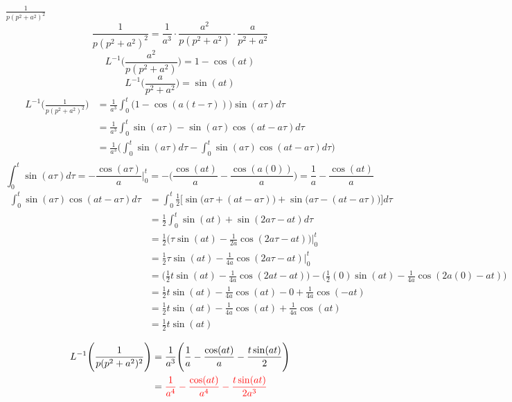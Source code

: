 \item[10.]$\frac{1}{p(p^2+a^2)^2}$
\[
    \frac{1}{p(p^2+a^2)^2} = \frac{1}{a^3} \cdot \frac{a^2}{p(p^2+a^2)} \cdot \frac{a}{p^2+a^2}
\]
\begin{equation*}
    L^{-1}\Bigg(\frac{a^2}{p(p^2+a^2)} \Bigg) 
    = 1-\cos(at)
    \tag{By \( L15 \)}
\end{equation*}
\begin{equation*}
    L^{-1}\Bigg(\frac{a}{p^2+a^2}\Bigg) 
    = \sin(at)
    \tag{By \( L3 \)}
\end{equation*}
\begin{align*}
    L^{-1}\Bigg( \frac{1}{p(p^2+a^2)^2} \Bigg)
    & = \frac{1}{a^3}\int_0^t \big(1-\cos(a(t-\tau))\big)\sin(a\tau)d\tau \\
    & = \frac{1}{a^3}\int_0^t \sin(a\tau)-\sin(a\tau)\cos(at-a\tau)d\tau \\
    & = \frac{1}{a^3}\Bigg(\int_0^t \sin(a\tau)d\tau-\int_0^t\sin(a\tau)\cos(at-a\tau)d\tau\Bigg) \\
\end{align*}
\[
    \int_0^t \sin(a\tau)d\tau =-\frac{\cos(a\tau)}{a}\Big|^t_0=-\Big(\frac{\cos(at)}{a}-\frac{\cos(a(0))}{a}\Big)=\frac{1}{a}-\frac{\cos(at)}{a}
\]
\begin{align*}
   \int_0^t\sin(a\tau)\cos(at-a\tau)d\tau
   & = \int_0^t \frac{1}{2}
   \Bigg[
   \sin\Big(a\tau+(at-a\tau)\Big)
   + \sin\Big(a\tau-(at-a\tau)\Big)
   \Bigg] d\tau\\
   & = \frac{1}{2}\int_0^t 
   \sin(at)
   + \sin(2a\tau-at) d\tau\\
   & = \frac{1}{2}\Big(
   \tau\sin(at)- \frac{1}{2a}\cos(2a\tau-at)
   \Big)\Big|^t_0\\
   & = \frac{1}{2}\tau\sin(at)- \frac{1}{4a}\cos(2a\tau-at)\Big|^t_0\\
   & = \Big(\frac{1}{2}t\sin(at)- \frac{1}{4a}\cos(2at-at)\Big)
   -\Big(\frac{1}{2}(0)\sin(at)- \frac{1}{4a}\cos(2a(0)-at)\Big)\\
   & = \frac{1}{2}t\sin(at)- \frac{1}{4a}\cos(at)
   -0+ \frac{1}{4a}\cos(-at)\\
   & = \frac{1}{2}t\sin(at)- \frac{1}{4a}\cos(at) + \frac{1}{4a}\cos(at)\\
   & = \frac{1}{2}t\sin(at)\\
\end{align*}
\begin{align*}
    L^{-1}\Bigg( \frac{1}{p(p^2+a^2)^2} \Bigg)
    & = \frac{1}{a^3}\Bigg(\frac{1}{a}-\frac{\cos(at)}{a}-\frac{t\sin(at)}{2}\Bigg) \\
    & = \textcolor{red}{\frac{1}{a^4}-\frac{\cos(at)}{a^4}-\frac{t\sin(at)}{2a^3}} \\
\end{align*}
